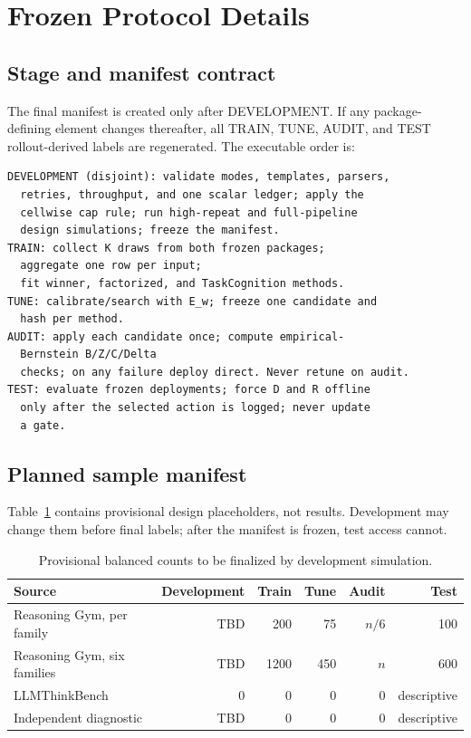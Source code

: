 \documentclass{article}
\newcommand{\1}{\mathbb{I}}
\begin{document}
\clearpage



\appendix
\section{Frozen Protocol Details}
\subsection{Stage and manifest contract}
The final manifest is created only after DEVELOPMENT. If any package-defining element changes thereafter, all TRAIN, TUNE, AUDIT, and TEST rollout-derived labels are regenerated. The executable order is:
\begin{verbatim}
DEVELOPMENT (disjoint): validate modes, templates, parsers,
  retries, throughput, and one scalar ledger; apply the
  cellwise cap rule; run high-repeat and full-pipeline
  design simulations; freeze the manifest.
TRAIN: collect K draws from both frozen packages;
  aggregate one row per input;
  fit winner, factorized, and TaskCognition methods.
TUNE: calibrate/search with E_w; freeze one candidate and
  hash per method.
AUDIT: apply each candidate once; compute empirical-
  Bernstein B/Z/C/Delta
  checks; on any failure deploy direct. Never retune on audit.
TEST: evaluate frozen deployments; force D and R offline
  only after the selected action is logged; never update
  a gate.
\end{verbatim}

\subsection{Planned sample manifest}
Table~\ref{tab:manifest} contains provisional design placeholders, not results. Development may change them before final labels; after the manifest is frozen, test access cannot.
\begin{table}[t]
\caption{Provisional balanced counts to be finalized by development simulation.}
\label{tab:manifest}
\centering\small
\begin{tabular}{lrrrrr}
\toprule
Source & Development & Train & Tune & Audit & Test \\
\midrule
Reasoning Gym, per family & TBD & 200 & 75 & $n/6$ & 100 \\
Reasoning Gym, six families & TBD & 1200 & 450 & $n$ & 600 \\
LLMThinkBench & 0 & 0 & 0 & 0 & descriptive \\
Independent diagnostic & TBD & 0 & 0 & 0 & descriptive \\
\bottomrule
\end{tabular}
\end{table}
\end{document}
